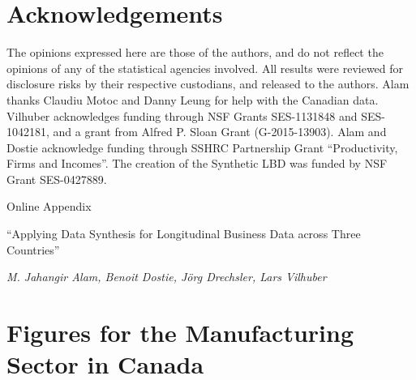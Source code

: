 \documentclass[10pt,twoside]{article}
\begin{document}
 

\section*{Acknowledgements}

The opinions expressed here are those of the authors, and do not reflect the opinions of any of the statistical agencies involved. All results were reviewed for disclosure risks by their respective custodians, and released to the authors.  Alam thanks Claudiu Motoc and Danny Leung for help with the Canadian data.  Vilhuber acknowledges funding through NSF Grants SES-1131848 and SES-1042181, and a grant from Alfred P. Sloan Grant (G-2015-13903). Alam and Dostie acknowledge funding through SSHRC Partnership Grant ``Productivity, Firms and Incomes''. The creation of the Synthetic LBD  was funded by NSF Grant SES-0427889.


\printbibliography


\newpage



\FloatBarrier

\appendix

\begin{center}
{\LARGE{Online Appendix}}

{``Applying Data Synthesis for Longitudinal Business Data across Three Countries''}

\textit{M. Jahangir Alam, Benoit Dostie, J\"org Drechsler, Lars Vilhuber}

\end{center}


\section{Figures for the Manufacturing Sector in Canada}
\label{sec:appendix_figures}
\end{document}
